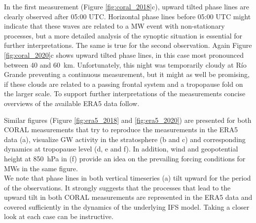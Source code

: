 In the first measurement (Figure \ref{fig:coral_2018}c), upward tilted phase lines are clearly observed after 05:00 UTC. Horizontal phase lines before 05:00 UTC might indicate that these waves are related to a MW event with non-stationary processes, but a more detailed analysis of the synoptic situation is essential for further interpretations. The same is true for the second observation. Again Figure \ref{fig:coral_2020}c shows upward tilted phase lines, in this case most pronounced between 40 and \SI{60}{\kilo\meter}. Unfortunately, this night was temporarily cloudy at Río Grande preventing a continuous measurement, but it might as well be promising, if these clouds are related to a passing frontal system and a tropopause fold on the larger scale. To support further interpretations of the measurements concise overviews of the available ERA5 data follow.

Similar figures (Figure \ref{fig:era5_2018} and \ref{fig:era5_2020}) are presented for both CORAL measurements that try to reproduce the measurements in the ERA5 data (a), visualize GW activity in the stratosphere (b and c) and corresponding dynamics at tropopause level (d, e and f). In addition, wind and geopotential height at \SI{850}{hPa} in (f) provide an idea on the prevailing forcing conditions for MWs in the same figure. \\
We note that phase lines in both vertical timeseries (a) tilt upward for the period of the observations. It strongly suggests that the processes that lead to the upward tilt in both CORAL measurements are represented in the ERA5 data and covered sufficiently in the dynamics of the underlying IFS model. Taking a closer look at each case can be instructive.

